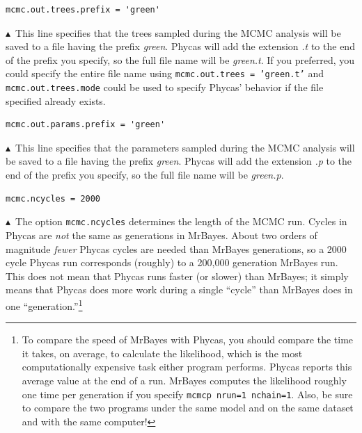 \documentclass[10pt]{article}
\newcommand{\pathname}[1]{{\em #1}}				%
\newcommand{\code}[1]{{\tt #1}}					%
\newcommand{\opt}[2]{{\tt \small #1.#2}\index{#1!#2}}	%
\newcommand{\pointup}{$\blacktriangle$}
\begin{document}
\begin{samepage}
\begin{verbatim}
mcmc.out.trees.prefix = 'green'
\end{verbatim}
\pointup\ This line specifies that the trees sampled during the MCMC analysis will be saved to a file having the prefix \pathname{green}. Phycas will add the extension \pathname{.t} to the end of the prefix you specify, so the full file name will be \pathname{green.t}. If you preferred, you could specify the entire file name using \code{mcmc.out.trees = 'green.t'} and \code{mcmc.out.trees.mode} could be used to specify Phycas' behavior if the file specified already exists.
\end{samepage}

\begin{samepage}
\begin{verbatim}
mcmc.out.params.prefix = 'green'
\end{verbatim}
\pointup\ This line specifies that the parameters sampled during the MCMC analysis will be saved to a file having the prefix \pathname{green}. Phycas will add the extension \pathname{.p} to the end of the prefix you specify, so the full file name will be \pathname{green.p}. 
\end{samepage}

\begin{samepage}
\begin{verbatim}
mcmc.ncycles = 2000
\end{verbatim}
\pointup\ The option \opt{mcmc}{ncycles} determines the length of the MCMC run. Cycles in Phycas are {\em not} the same as generations in MrBayes. About two orders of magnitude {\em fewer} Phycas cycles are needed than MrBayes generations, so a 2000 cycle Phycas run corresponds (roughly) to a 200,000 generation MrBayes run. This does not mean that Phycas runs faster (or slower) than MrBayes; it simply means that Phycas does more work during a single ``cycle'' than MrBayes does in one ``generation.''\footnote{To compare the speed of MrBayes with Phycas, you should compare the time it takes, on average, to calculate the likelihood, which is the most computationally expensive task either program performs. Phycas reports this average value at the end of a run. MrBayes computes the likelihood roughly one time per generation if you specify \code{mcmcp nrun=1 nchain=1}. Also, be sure to compare the two programs under the same model and on the same dataset and with the same computer!}
\end{samepage}
\end{document}
